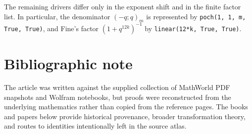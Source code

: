 \documentclass[11pt,oneside]{article}
\theoremstyle{definition}
\begin{document}
The remaining drivers differ only in the exponent shift and in the finite
factor list.  In particular, the denominator $(-q;q)_m$ is represented by
\texttt{poch(1, 1, m, True, True)}, and Fine's factor
$(1+q^{12k})^{-1}$ by \texttt{linear(12*k, True, True)}.


\section*{Bibliographic note}

The article was written against the supplied collection of MathWorld PDF
snapshots and Wolfram notebooks, but proofs were reconstructed from the
underlying mathematics rather than copied from the reference pages.  The
books and papers below provide historical provenance, broader transformation
theory, and routes to identities intentionally left in the source atlas.
\end{document}
